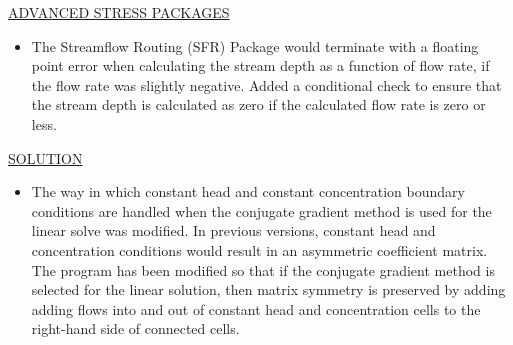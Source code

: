 	\underline{ADVANCED STRESS PACKAGES}
	\begin{itemize}
	        \item The Streamflow Routing (SFR) Package would terminate with a floating point error when calculating the stream depth as a function of flow rate, if the flow rate was slightly negative.  Added a conditional check to ensure that the stream depth is calculated as zero if the calculated flow rate is zero or less.
	\end{itemize}

	\underline{SOLUTION}
	\begin{itemize}
	        \item The way in which constant head and constant concentration boundary conditions are handled when the conjugate gradient method is used for the linear solve was modified.  In previous versions, constant head and concentration conditions would result in an asymmetric coefficient matrix.  The program has been modified so that if the conjugate gradient method is selected for the linear solution, then matrix symmetry is preserved by adding adding flows into and out of constant head and concentration cells to the right-hand side of connected cells.
	\end{itemize}


